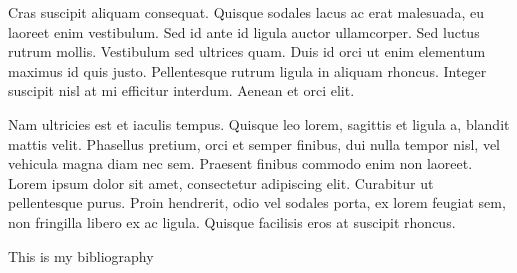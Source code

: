 \documentclass[a4paper, nobind]{templates/ociamthesis}
\newcommand*{\bibtitle}{\textbf{Bibliography}}
\theoremstyle{definition}
\theoremstyle{definition}
\theoremstyle{definition}
\theoremstyle{remark}
\begin{document}
Cras suscipit aliquam consequat. Quisque sodales lacus ac erat malesuada, eu laoreet enim vestibulum. Sed id ante id ligula auctor ullamcorper. Sed luctus rutrum mollis. Vestibulum sed ultrices quam. Duis id orci ut enim elementum maximus id quis justo. Pellentesque rutrum ligula in aliquam rhoncus. Integer suscipit nisl at mi efficitur interdum. Aenean et orci elit.

Nam ultricies est et iaculis tempus. Quisque leo lorem, sagittis et ligula a, blandit mattis velit. Phasellus pretium, orci et semper finibus, dui nulla tempor nisl, vel vehicula magna diam nec sem. Praesent finibus commodo enim non laoreet. Lorem ipsum dolor sit amet, consectetur adipiscing elit. Curabitur ut pellentesque purus. Proin hendrerit, odio vel sodales porta, ex lorem feugiat sem, non fringilla libero ex ac ligula. Quisque facilisis eros at suscipit rhoncus.

This is my bibliography





\nocite{*}

\setlength{\baselineskip}{0pt} %

{\renewcommand*\MakeUppercase[1]{#1}%
\printbibliography[heading=bibintoc,title={\bibtitle}]}
\end{document}
